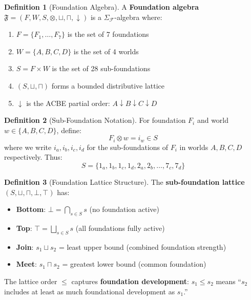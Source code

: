 \documentclass[11pt,twoside,openright]{book}
\theoremstyle{definition}
\newtheorem{definition}{Definition}[chapter]
\theoremstyle{plain}
\theoremstyle{remark}
\newcommand{\Foundations}{\mathcal{F}}
\begin{document}
\begin{definition}[Foundation Algebra]
\label{def:foundation-algebra}
A \textbf{Foundation algebra} $\mathfrak{F} = (F, W, S, \otimes, \sqcup, \sqcap, \downarrow)$ is a $\Sigma_\Foundations$-algebra where:
\begin{enumerate}[label=(\roman*)]
  \item $F = \{F_1, \ldots, F_7\}$ is the set of 7 foundations
  \item $W = \{A, B, C, D\}$ is the set of 4 worlds
  \item $S = F \times W$ is the set of 28 sub-foundations
  \item $(S, \sqcup, \sqcap)$ forms a bounded distributive lattice
  \item $\downarrow$ is the ACBE partial order: $A \downarrow B \downarrow C \downarrow D$
\end{enumerate}
\end{definition}

\begin{definition}[Sub-Foundation Notation]
\label{def:subfound-notation}
For foundation $F_i$ and world $w \in \{A, B, C, D\}$, define:
\[
F_i \otimes w = i_w \in S
\]
where we write $i_a, i_b, i_c, i_d$ for the sub-foundations of $F_i$ in worlds $A, B, C, D$ respectively. Thus:
\[
S = \{1_a, 1_b, 1_c, 1_d, 2_a, 2_b, \ldots, 7_c, 7_d\}
\]
\end{definition}

\begin{definition}[Foundation Lattice Structure]
\label{def:foundation-lattice}
The \textbf{sub-foundation lattice} $(S, \sqcup, \sqcap, \bot, \top)$ has:
\begin{itemize}
  \item \textbf{Bottom}: $\bot = \bigcap_{s \in S} s$ (no foundation active)
  \item \textbf{Top}: $\top = \bigsqcup_{s \in S} s$ (all foundations fully active)
  \item \textbf{Join}: $s_1 \sqcup s_2$ = least upper bound (combined foundation strength)
  \item \textbf{Meet}: $s_1 \sqcap s_2$ = greatest lower bound (common foundation)
\end{itemize}
The lattice order $\leq$ captures \textbf{foundation development}: $s_1 \leq s_2$ means ``$s_2$ includes at least as much foundational development as $s_1$.''
\end{definition}
\end{document}
